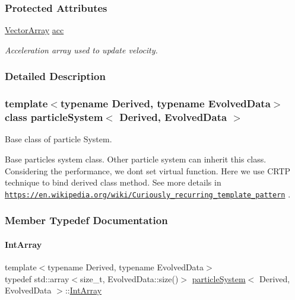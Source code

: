 \subsubsection*{Protected Attributes}
\begin{DoxyCompactItemize}
\item 
\mbox{\hyperlink{classparticle_system_a6f66ed187a286c0d42ab2f83b8b6193b}{Vector\+Array}} \mbox{\hyperlink{classparticle_system_ad7e503534c878abae38d4b06f50286fb}{acc}}
\begin{DoxyCompactList}\small\item\em Acceleration array used to update velocity. \end{DoxyCompactList}\end{DoxyCompactItemize}


\subsubsection{Detailed Description}
\subsubsection*{template$<$typename Derived, typename Evolved\+Data$>$\newline
class particle\+System$<$ Derived, Evolved\+Data $>$}

Base class of particle System. 

Base particles system class. Other particle system can inherit this class. Considering the performance, we don\textquotesingle{}t set virtual function. Here we use C\+R\+TP technique to bind derived class method. See more details in \href{https://en.wikipedia.org/wiki/Curiously_recurring_template_pattern}{\tt https\+://en.\+wikipedia.\+org/wiki/\+Curiously\+\_\+recurring\+\_\+template\+\_\+pattern} . 

\subsubsection{Member Typedef Documentation}
\mbox{\label{classparticle_system_aee9dc82f46ce17a477251805094cf19f}} 
\paragraph{\texorpdfstring{Int\+Array}{IntArray}}
{\footnotesize\ttfamily template$<$typename Derived, typename Evolved\+Data$>$ \\
typedef std\+::array$<$size\+\_\+t, Evolved\+Data\+::size()$>$ \mbox{\hyperlink{classparticle_system}{particle\+System}}$<$ Derived, Evolved\+Data $>$\+::\mbox{\hyperlink{classparticle_system_aee9dc82f46ce17a477251805094cf19f}{Int\+Array}}}

